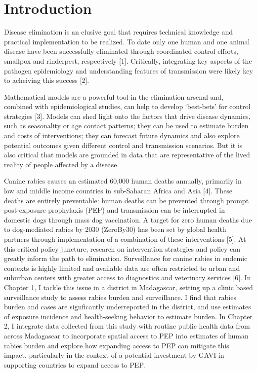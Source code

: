 \documentclass[
]{book}
\begin{document}
{
\setcounter{tocdepth}{1}
\tableofcontents
}
\mainmatter

\pagestyle{fancy}
\lhead{}
\chead{}
\rhead{\thepage}
\cfoot{} 
\renewcommand{\headrulewidth}{0pt}
\renewcommand{\footrulewidth}{0pt}

\hypertarget{introduction}{%
\chapter{Introduction}\label{introduction}}

Disease elimination is an elusive goal that requires technical knowledge and practical implementation to be realized. To date only one human and one animal disease have been successfully eliminated through coordinated control efforts, smallpox and rinderpest, respectively {[}1{]}. Critically, integrating key aspects of the pathogen epidemiology and understanding features of transmission were likely key to acheiving this success {[}2{]}.

Mathematical models are a powerful tool in the elimination arsenal and, combined with epidemiological studies, can help to develop `best-bets' for control strategies {[}3{]}. Models can shed light onto the factors that drive disease dynamics, such as seasonality or age contact patterns; they can be used to estimate burden and costs of interventions; they can forecast future dynamics and also explore potential outcomes given different control and transmission scenarios. But it is also critical that models are grounded in data that are representative of the lived reality of people affected by a disease.

Canine rabies causes an estimated 60,000 human deaths annually, primarily in low and middle income countries in sub-Saharan Africa and Asia {[}4{]}. These deaths are entirely preventable: human deaths can be prevented through prompt post-exposure prophylaxis (PEP) and transmission can be interrupted in domestic dogs through mass dog vaccination. A target for zero human deaths due to dog-mediated rabies by 2030 (ZeroBy30) has been set by global health partners through implementation of a combination of these interventions {[}5{]}. At this critical policy juncture, research on intervention strategies and policy can greatly inform the path to elimination. Surveillance for canine rabies in endemic contexts is highly limited and available data are often restricted to urban and suburban centers with greater access to diagnostics and veterinary services {[}6{]}. In Chapter 1, I tackle this issue in a district in Madagascar, setting up a clinic based surveillance study to assess rabies burden and surveillance. I find that rabies burden and cases are signficantly underreported in the district, and use estimates of exposure incidence and health-seeking behavior to estimate burden. In Chapter 2, I integrate data collected from this study with routine public health data from across Madagascar to incorporate spatial access to PEP into estimates of human rabies burden and explore how expanding access to PEP can mitigate this impact, particularly in the context of a potential investment by GAVI in supporting countries to expand access to PEP.
\end{document}
